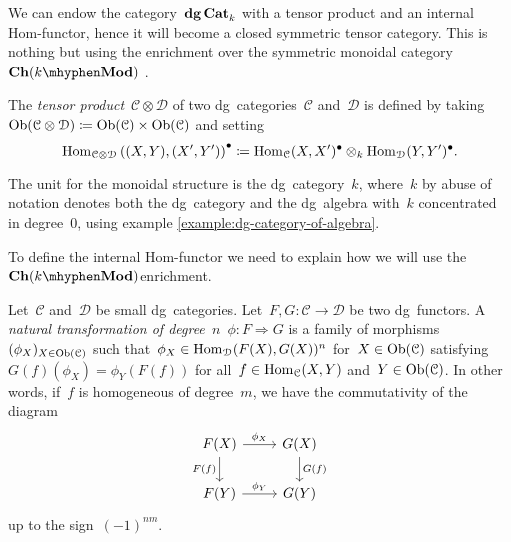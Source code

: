 \begin{refsection}
We can endow the category~$\mathbf{dg\,Cat}_k$ with a tensor product and an internal Hom-functor, hence it will become a closed symmetric tensor category. This is nothing but using the enrichment over the symmetric monoidal category~$\Ch(k\mhyphen\Mod)$ \cite[Section~1.4]{lnm145}.
\begin{definition}
  The \emph{tensor product}~$\mathcal{C}\otimes\mathcal{D}$ of two dg~categories~$\mathcal{C}$ and~$\mathcal{D}$ is defined by taking~$\operatorname{Ob}(\mathcal{C}\otimes\mathcal{D})\coloneqq\operatorname{Ob}(\mathcal{C})\times\operatorname{Ob}(\mathcal{C})$ and setting
  \begin{equation}
    \label{equation:tensor-product-dg-categories}
    \mathrm{Hom}_{\mathcal{C}\otimes\mathcal{D}}\left( (X,Y),(X',Y') \right)^\bullet\coloneqq\mathrm{Hom}_{\mathcal{C}}(X,X')^\bullet\otimes_k\mathrm{Hom}_{\mathcal{D}}(Y,Y')^\bullet.
  \end{equation}
\end{definition}
\begin{remark}
  \label{remark:unit-monoidal-structure}
  The unit for the monoidal structure is the dg~category~$k$, where~$k$ by abuse of notation denotes both the dg~category and the dg~algebra with~$k$ concentrated in degree~$0$, using example \ref{example:dg-category-of-algebra}.
\end{remark}

To define the internal Hom-functor we need to explain how we will use the~$\Ch(k\mhyphen\Mod)$\dash enrichment.
\begin{definition}
  \label{definition:complex-of-graded-morphisms}
  Let~$\mathcal{C}$ and~$\mathcal{D}$ be small dg~categories. Let~$F,G\colon\mathcal{C}\to\mathcal{D}$ be two dg~functors. A \emph{natural transformation of degree~$n$}~$\phi\colon F\Rightarrow G$ is a family of morphisms~$(\phi_X)_{X\in\operatorname{Ob}(\mathcal{C})}$ such that~$\phi_X\in\mathrm{Hom}_{\mathcal{D}}(F(X),G(X))^n$ for~$X\in\operatorname{Ob}(\mathcal{C})$ satisfying~$G(f)(\phi_X)=\phi_Y(F(f))$ for all~$f\in\mathrm{Hom}_{\mathcal{C}}(X,Y)$ and~$Y\in\operatorname{Ob}(\mathcal{C})$. In other words, if~$f$ is homogeneous of degree~$m$, we have the commutativity of the diagram
  \begin{equation}
    \begin{tikzcd}
      F(X) \arrow{r}{\phi_X} \arrow[swap]{d}{F(f)} & G(X) \arrow{d}{G(f)} \\
      F(Y) \arrow{r}{\phi_Y} & G(Y)
    \end{tikzcd}
  \end{equation}
  up to the sign~$(-1)^{nm}$.


\end{definition}
\end{refsection}
